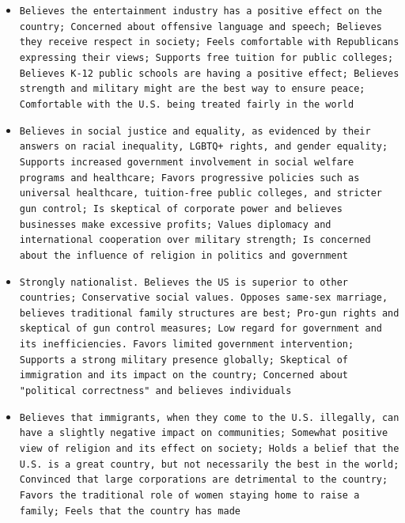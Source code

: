 \documentclass[11pt]{article}
\begin{document}
\begin{itemize}
\item \texttt{Believes the entertainment industry has a positive effect on the country; Concerned about offensive language and speech; Believes they receive respect in society; Feels comfortable with Republicans expressing their views; Supports free tuition for public colleges; Believes K-12 public schools are having a positive effect; Believes strength and military might are the best way to ensure peace; Comfortable with the U.S. being treated fairly in the world}
\item \texttt{Believes in social justice and equality, as evidenced by their answers on racial inequality, LGBTQ+ rights, and gender equality; Supports increased government involvement in social welfare programs and healthcare; Favors progressive policies such as universal healthcare, tuition-free public colleges, and stricter gun control; Is skeptical of corporate power and believes businesses make excessive profits; Values diplomacy and international cooperation over military strength; Is concerned about the influence of religion in politics and government}
\item \texttt{Strongly nationalist. Believes the US is superior to other countries; Conservative social values. Opposes same-sex marriage, believes traditional family structures are best; Pro-gun rights and skeptical of gun control measures; Low regard for government and its inefficiencies. Favors limited government intervention; Supports a strong military presence globally; Skeptical of immigration and its impact on the country; Concerned about "political correctness" and believes individuals}
\item \texttt{Believes that immigrants, when they come to the U.S. illegally, can have a slightly negative impact on communities; Somewhat positive view of religion and its effect on society; Holds a belief that the U.S. is a great country, but not necessarily the best in the world; Convinced that large corporations are detrimental to the country; Favors the traditional role of women staying home to raise a family; Feels that the country has made}
\end{itemize}
\end{document}
